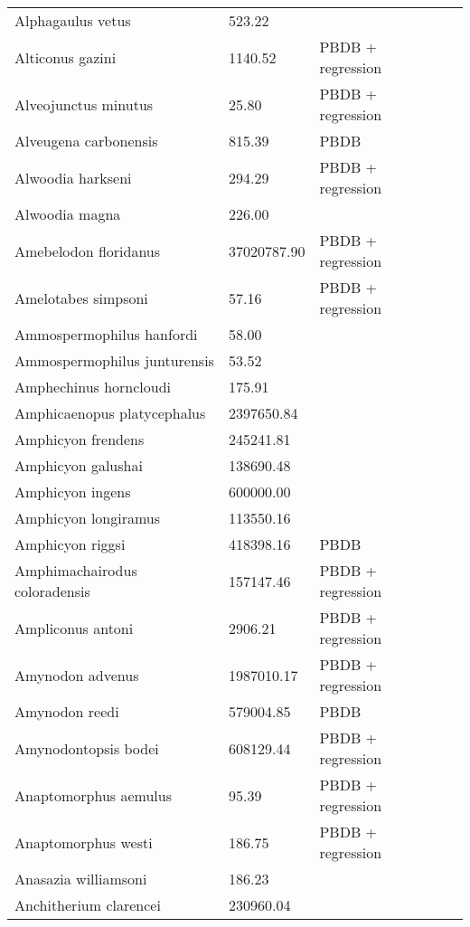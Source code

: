 \documentclass{article}
\begin{document}
\begin{center}
\begin{longtable}{p{} p{} p{} p{}}
    Alphagaulus vetus & 523.22 & \cite{Tomiya2013} &  \\ 
    Alticonus gazini & 1140.52 & PBDB + regression &  \\ 
    Alveojunctus minutus & 25.80 & PBDB + regression &  \\ 
    Alveugena carbonensis & 815.39 & PBDB &  \\ 
    Alwoodia harkseni & 294.29 & PBDB + regression &  \\ 
    Alwoodia magna & 226.00 & \cite{McKenna2011} &  \\ 
    Amebelodon floridanus & 37020787.90 & PBDB + regression &  \\ 
    Amelotabes simpsoni & 57.16 & PBDB + regression &  \\ 
    Ammospermophilus hanfordi & 58.00 & \cite{McKenna2011} &  \\ 
    Ammospermophilus junturensis & 53.52 & \cite{Tomiya2013} &  \\ 
    Amphechinus horncloudi & 175.91 & \cite{Tomiya2013} &  \\ 
    Amphicaenopus platycephalus & 2397650.84 & \cite{Tomiya2013} &  \\ 
    Amphicyon frendens & 245241.81 & \cite{Tomiya2013} &  \\ 
    Amphicyon galushai & 138690.48 & \cite{Tomiya2013} &  \\ 
    Amphicyon ingens & 600000.00 & \cite{Sorkin2008} &  \\ 
    Amphicyon longiramus & 113550.16 & \cite{Tomiya2013} &  \\ 
    Amphicyon riggsi & 418398.16 & PBDB &  \\ 
    Amphimachairodus coloradensis & 157147.46 & PBDB + regression &  \\ 
    Ampliconus antoni & 2906.21 & PBDB + regression &  \\ 
    Amynodon advenus & 1987010.17 & PBDB + regression &  \\ 
    Amynodon reedi & 579004.85 & PBDB &  \\ 
    Amynodontopsis bodei & 608129.44 & PBDB + regression &  \\ 
    Anaptomorphus aemulus & 95.39 & PBDB + regression &  \\ 
    Anaptomorphus westi & 186.75 & PBDB + regression &  \\ 
    Anasazia williamsoni & 186.23 & \cite{Williamson2012} &  \\ 
    Anchitherium clarencei & 230960.04 & \cite{Tomiya2013} &  \\ 

\end{longtable}
\end{center}
\end{document}
